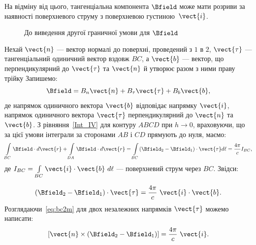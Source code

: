 На відміну від цього, тангенціальна компонента $\Bfield$ може мати розриви за наявності поверхневого струму з
поверхневою густиною~$\vect{i}$.

\begin{figure}
	\centering
	\caption{До виведення другої граничної умови для $\Bfield$}%
	\label{tikz:bc2m}
\end{figure}

Нехай $\vect{n}$ --- вектор нормалі до поверхні, проведений з $1$ в $2$,  $\vect{\tau}$ --- тангенціальний одиничний
вектор вздовж $BC$, а $\vect{b}$ --- вектор, що перпендикулярний до $\vect{\tau}$ та $\vect{n}$ й утворює разом з ними
праву трійку Запишемо:
\begin{equation*}
	\Bfield = B_n\vect{n} + B_{\tau}\vect{\tau} + B_b\vect{b},
\end{equation*}
де напрямок одиничного вектора $\vect{b}$ відповідає напрямку $\vect{i}$, напрямок одиничного вектора $\vect{\tau}$
перпендикулярний до $\vect{n}$ та $\vect{b}$. З рівняння~\eqref{Int_IV} для контуру $ABCD$ при $h \to 0$, враховуючи, що
за цієї умови інтеграли за сторонами $AB$ і $CD$ прямують до нуля, маємо:
\begin{equation*}
	\int\limits_{BC} \Bfield\cdot d\vect{r} + \int\limits_{DA} \Bfield\cdot d\vect{r} = \int\limits_{BC} (\Bfield_2 - \Bfield_1)\cdot\vect{\tau} d\ell =
	\frac{4\pi}c I_{BC},
\end{equation*}
де $I_{BC} = \int\limits_{BC} \vect{i}\cdot\vect{b}\ d\ell$ --- поверхневий струм через $BC$. Звідси:

\begin{equation}\label{eq:bc2m}
	(\Bfield_2 - \Bfield_1)\cdot\vect{\tau} = \frac{4\pi}c\ \vect{i}\cdot\vect{b}.
\end{equation}
Розглядаючи~\eqref{eq:bc2m} для двох незалежних напрямків $\vect{\tau}$ можемо написати:
\begin{equation}\label{eq:bc2m2}
	\left[ \vect{n}\times(\Bfield_2 - \Bfield_1)\right]  = \frac{4\pi}c\ \vect{i}.
\end{equation}

